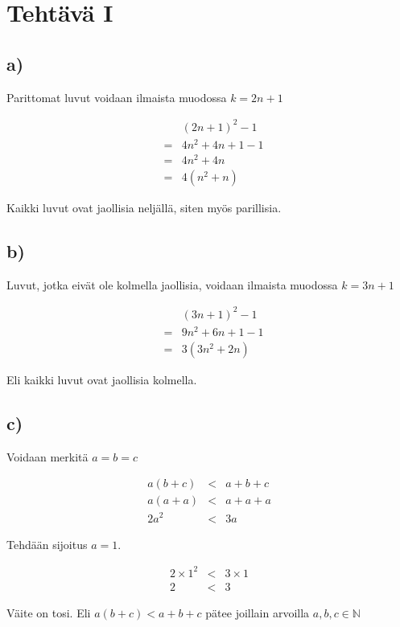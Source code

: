 \documentclass[a4paper, 12pt]{article}
\begin{document}
\section*{Tehtävä I}
\subsection*{a)}
Parittomat luvut voidaan ilmaista muodossa $k=2n+1$
\begin{center}
\begin{eqnarray*}
&& \left(2n+1\right)^2-1 \\ 
& = & 4n^2+4n+1-1 \\
& = & 4n^2+4n \\
& = & 4\left(n^2+n\right)
\end{eqnarray*}
\end{center}
Kaikki luvut ovat jaollisia neljällä, siten myös parillisia.
\subsection*{b)}
Luvut, jotka eivät ole kolmella jaollisia, voidaan ilmaista muodossa $k=3n+1$

\begin{center}
\begin{eqnarray*}
&& \left(3n+1\right)^2-1 \\
& = & 9n^2+6n+1-1 \\
& = & 3\left(3n^2+2n\right)
\end{eqnarray*}
\end{center}
Eli kaikki luvut ovat jaollisia kolmella.
\subsection*{c)}
Voidaan merkitä $a=b=c$
\begin{center}
\begin{eqnarray*}
a\left(b+c\right)&<&a+b+c \\
a\left(a+a\right)&<&a+a+a \\
2a^2 &<& 3a
\end{eqnarray*}
\end{center}
Tehdään sijoitus $a=1$.

\begin{center}
\begin{eqnarray*}
2 \times 1^{2} &<&  3 \times 1 \\
2 &<& 3
\end{eqnarray*}
\end{center}
Väite on tosi. Eli $a\left(b+c\right)<a+b+c$ pätee joillain arvoilla $a,b,c \in \mathbb{N}$
\end{document}
